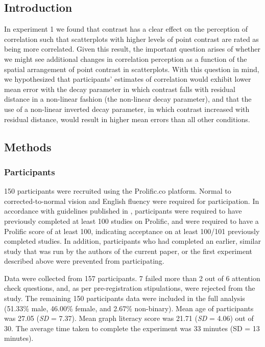 \documentclass[preprint, 3p,
authoryear]{elsarticle} %
\begin{document}
\hypertarget{introduction-2}{%
\subsection{Introduction}\label{introduction-2}}

In experiment 1 we found that contrast has a clear effect on the
perception of correlation such that scatterplots with higher levels of
point contrast are rated as being more correlated. Given this result,
the important question arises of whether we might see additional changes
in correlation perception as a function of the spatial arrangement of
point contrast in scatterplots. With this question in mind, we
hypothesized that participants' estimates of correlation would exhibit
lower mean error with the decay parameter in which contrast falls with
residual distance in a non-linear fashion (the non-linear decay
parameter), and that the use of a non-linear inverted decay parameter,
in which contrast increased with residual distance, would result in
higher mean errors than all other conditions.

\hypertarget{methods}{%
\subsection{Methods}\label{methods}}

\hypertarget{participants-1}{%
\subsubsection{Participants}\label{participants-1}}

150 participants were recruited using the Prolific.co platform. Normal
to corrected-to-normal vision and English fluency were required for
participation. In accordance with guidelines published in
\citep{peer_2021}, participants were required to have previously
completed at least 100 studies on Prolific, and were required to have a
Prolific score of at least 100, indicating acceptance on at least
100/101 previously completed studies. In addition, participants who had
completed an earlier, similar study that was run by the authors of the
current paper, or the first experiment described above were prevented
from participating.

Data were collected from 157 participants. 7 failed more than 2 out of 6
attention check questions, and, as per pre-registration stipulations,
were rejected from the study. The remaining 150 participants data were
included in the full analysis (51.33\% male, 46.00\% female, and 2.67\%
non-binary). Mean age of participants was 27.05 (\emph{SD} = 7.37). Mean
graph literacy score was 21.71 (\emph{SD} = 4.06) out of 30. The average
time taken to complete the experiment was 33 minutes (SD = 13 minutes).
\end{document}
